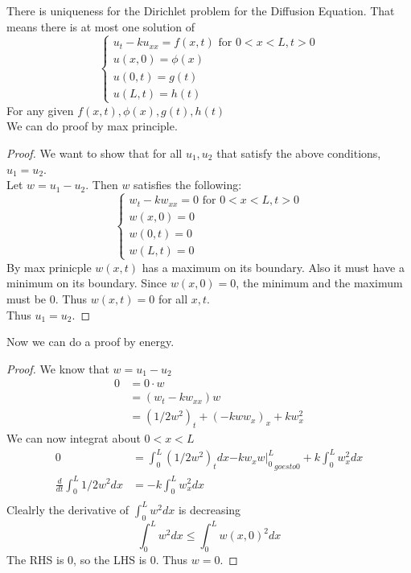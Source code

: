 \documentclass[answers,12pt,addpoints]{exam}
\begin{document}
\begin{definition}[Uniqueness]
    There is uniqueness for the Dirichlet problem for the Diffusion Equation.
    That means there is at most one solution of 
    $$ \begin{cases}
        u_t - ku_{xx} = f(x,t) \text{ for } 0 < x < L, t > 0\\
        u(x,0) = \phi(x) \\
        u(0,t) = g(t) \\
        u(L,t) = h(t)
    \end{cases}$$
    For any given $f(x,t), \phi(x), g(t), h(t)$\\
    We can do proof by max principle.
    \begin{proof}
        We want to show that for all $u_1, u_2$ that satisfy the above conditions, $u_1 = u_2$.\\
        Let $w = u_1 - u_2$. Then $w$ satisfies the following:
        $$ \begin{cases}
            w_t - kw_{xx} = 0 \text{ for } 0 < x < L, t > 0\\
            w(x,0) = 0 \\
            w(0,t) = 0 \\
            w(L,t) = 0
        \end{cases}$$
        By max prinicple $w(x,t)$ has a maximum on its boundary. Also it must have a minimum on its boundary. Since $w(x,0) = 0$, the minimum and the maximum must be 0. Thus $w(x,t) = 0$ for all $x,t$.\\
        Thus $u_1 = u_2$.
    \end{proof}
    Now we can do a proof by energy.
    \begin{proof}
        We know that $w = u_1 - u_2$\\
        \begin{align}
            0 &= 0 \cdot w\\
            &= (w_t - kw_{xx})w\\
            &= (1/2w^2)_t + (-kw w_x)_x + kw_x^2
        \end{align}
        We can now integrat about $0 < x < L$ \\
        \begin{align}
            0 &= \int_0^L (1/2w^2)_t dx {- kw_x w |_0^L}_{goes to 0} + k \int_0^L w_x^2 dx\\
            \frac{d}{dt} \int_0^L 1/2w^2 dx &= -k  \int_0^L w_x^2 dx\\
        \end{align}
        Clealrly the derivative of $\int_0^L w^2 dx$ is decreasing 
        $$ \int_0^L w^2 dx \leq \int_0^L w(x,0)^2 dx $$
        The RHS is 0, so the LHS is 0. Thus $w = 0$. 
    \end{proof}
\end{definition}
\end{document}
